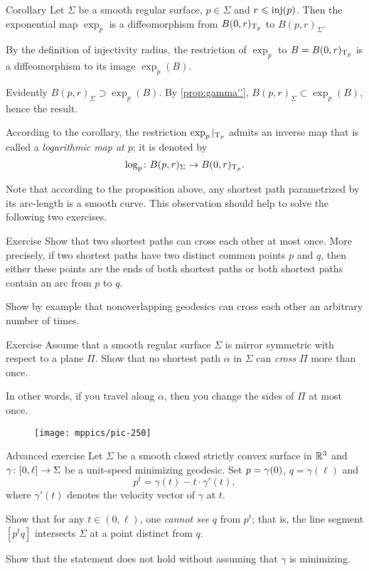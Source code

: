 \begin{thm}{Corollary}
Let $\Sigma$ be a smooth regular surface, $p\in\Sigma$ and $r\z\le \inj(p)$.
Then  the exponential map $\exp_p$ is a diffeomorphism from $B(0,r)_{\mathrm{T}_p}$ to $B(p,r)_\Sigma$.
\end{thm}

By the definition of injectivity radius, the restriction of $\exp_p$ to $B={B(0,r)_{\mathrm{T}_p}}$ is a diffeomorphism to its image $\exp_p(B)$.

Evidently $B(p,r)_\Sigma\supset\exp_p(B)$.
By \ref{prop:gamma''}, $B(p,r)_\Sigma\subset\exp_p(B)$, hence the result.
\qeds

According to the corollary, the restriction $\exp_p|_{\mathrm{T}_p}$ admits an inverse map that is called a \emph{logarithmic map at $p$};
it is denoted by \[\log_p\colon B(p,r)_\Sigma\to B(0,r)_{\mathrm{T}_p}.\]

Note that according to the proposition above, any shortest path parametrized by its arc-length is a smooth curve.
This observation should help to solve the following two exercises.


\begin{thm}{Exercise}\label{ex:two-min-geod}
Show that two shortest paths can cross each other at most once.
More precisely, if two shortest paths have two distinct common points $p$ and $q$, then either these points are the ends of both shortest paths or both shortest paths contain an arc from $p$ to $q$.

Show by example that nonoverlapping geodesics can cross each other an arbitrary number of times.
\end{thm}

\begin{thm}{Exercise}\label{ex:min-geod+plane}
Assume that a smooth regular surface $\Sigma$ is mirror symmetric with respect to a plane $\Pi$.
Show that no shortest path $\alpha$ in $\Sigma$ can {}\emph{cross} $\Pi$ more than once.


In other words, if you travel along $\alpha$, then you change the sides of $\Pi$ at most once. 
\end{thm}

{

\begin{wrapfigure}{r}{40 mm}
\vskip-8mm
\centering
\texttt{[image: mppics/pic-250]}
\vskip-0mm
\end{wrapfigure}

\begin{thm}{Advanced exercise}\label{ex:milka}
Let $\Sigma$ be a smooth closed strictly convex surface 
in $\mathbb{R}^3$ 
and $\gamma\:[0,\ell]\z\to \Sigma$ be a unit-speed minimizing geodesic.
Set $p\z=\gamma(0)$, $q=\gamma(\ell)$ and 
$$p^t=\gamma(t)-t\cdot\gamma'(t),$$ 
where $\gamma'(t)$ denotes the velocity vector of $\gamma$ at $t$.

Show that for any $t\in (0,\ell)$,
one {}\emph{cannot see}  $q$ from $p^t$;
that is, the line segment $[p^tq]$ intersects $\Sigma$ at a point distinct from $q$.

Show that the statement does not hold without assuming that $\gamma$ is minimizing.
\end{thm}

}

